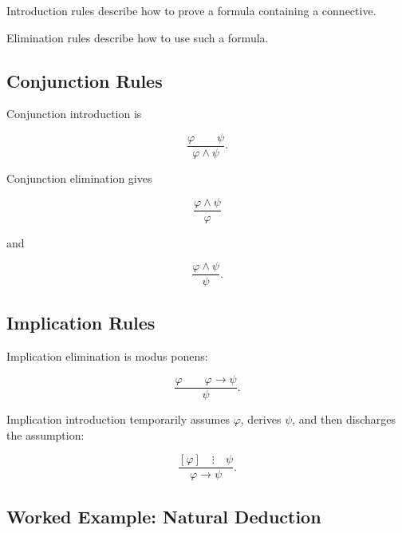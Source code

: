 Introduction rules describe how to prove a formula containing a connective.

Elimination rules describe how to use such a formula.

\subsection{Conjunction Rules}
\label{subsec:natural-deduction-conjunction}

Conjunction introduction is

\[
\boxed{
\frac{
\varphi
\qquad
\psi
}{
\varphi\land\psi
}.
}
\]

Conjunction elimination gives

\[
\boxed{
\frac{
\varphi\land\psi
}{
\varphi
}
}
\]

and

\[
\boxed{
\frac{
\varphi\land\psi
}{
\psi
}.
}
\]

\subsection{Implication Rules}
\label{subsec:natural-deduction-implication}

Implication elimination is modus ponens:

\[
\boxed{
\frac{
\varphi
\qquad
\varphi\rightarrow\psi
}{
\psi
}.
}
\]

Implication introduction temporarily assumes \(\varphi\), derives \(\psi\),
and then discharges the assumption:

\[
\boxed{
\frac{
[\varphi]
\quad
\vdots
\quad
\psi
}{
\varphi\rightarrow\psi
}.
}
\]

\subsection{Worked Example: Natural Deduction}
\label{subsec:worked-natural-deduction}

